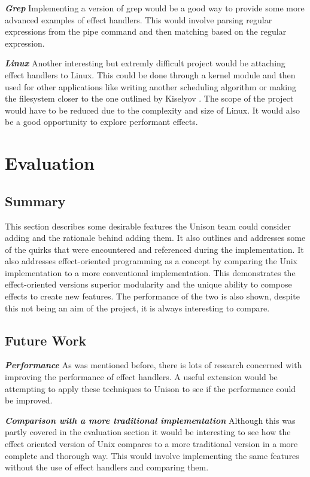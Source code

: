 \documentclass[logo,bsc,singlespacing,parskip]{infthesis}
\begin{document}
\emph{\textbf{Grep}} Implementing a version of grep would be a good way to
provide some more advanced examples of effect handlers. This would involve
parsing regular expressions from the pipe command and then matching based on 
the regular expression.

\emph{\textbf{Linux}} Another interesting but extremly difficult project would
be attaching effect handlers to Linux. This could be done through a kernel
module and then used for other applications like writing another scheduling
algorithm or making the filesystem closer to the one outlined by Kiselyov
\cite{DBLP:conf/context/KiselyovS07}. The scope of the project would have to be
reduced due to the complexity and size of Linux. It would also be a good
opportunity to explore performant effects.

\section{Evaluation}

\subsection{Summary}

This section describes some desirable features the Unison team could consider
adding and the rationale behind adding them. It also outlines and addresses
some of the quirks that were encountered and referenced during the
implementation. It also addresses effect-oriented programming as a concept by
comparing the Unix implementation to a more conventional implementation. This
demonstrates the effect-oriented versions superior modularity and the unique
ability to compose effects to create new features. The performance of the two
is also shown, despite this not being an aim of the project, it is always
interesting to compare.

\subsection{Future Work}

\emph{\textbf{Performance}} As was mentioned before, there is lots of research
concerned with improving the performance of effect handlers. A useful extension
would be attempting to apply these techniques to Unison to see if the
performance could be improved.

\emph{\textbf{Comparison with a more traditional implementation}} Although this 
was partly covered in the evaluation section it would be interesting to see how
the effect oriented version of Unix compares to a more traditional version in
a more complete and thorough way. This would involve implementing the same
features without the use of effect handlers and comparing them.
\end{document}
